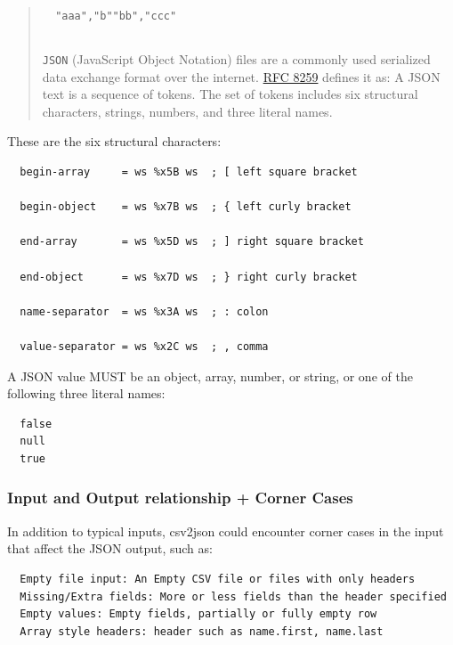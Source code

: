 \documentclass[
]{article}
\begin{document}
\begin{quote}
\begin{verbatim}
  "aaa","b""bb","ccc"
\end{verbatim}

\mbox{}%
\subsection{}\label{section}

\texttt{JSON} (JavaScript Object Notation) files are a commonly used
serialized data exchange format over the internet.
\href{https://www.rfc-editor.org/info/rfc8259/\#section-1}{RFC 8259}
defines it as: A JSON text is a sequence of tokens. The set of tokens
includes six structural characters, strings, numbers, and three literal
names.
\end{quote}

These are the six structural characters:

\begin{verbatim}
  begin-array     = ws %x5B ws  ; [ left square bracket

  begin-object    = ws %x7B ws  ; { left curly bracket

  end-array       = ws %x5D ws  ; ] right square bracket

  end-object      = ws %x7D ws  ; } right curly bracket

  name-separator  = ws %x3A ws  ; : colon

  value-separator = ws %x2C ws  ; , comma
\end{verbatim}

A JSON value MUST be an object, array, number, or string, or one of the
following three literal names:

\begin{verbatim}
  false
  null
  true
\end{verbatim}

\subsubsection{Input and Output relationship + Corner
Cases}\label{input-and-output-relationship-corner-cases}

In addition to typical inputs, csv2json could encounter corner cases in
the input that affect the JSON output, such as:

\begin{verbatim}
  Empty file input: An Empty CSV file or files with only headers
  Missing/Extra fields: More or less fields than the header specified
  Empty values: Empty fields, partially or fully empty row
  Array style headers: header such as name.first, name.last
\end{verbatim}
\end{document}
